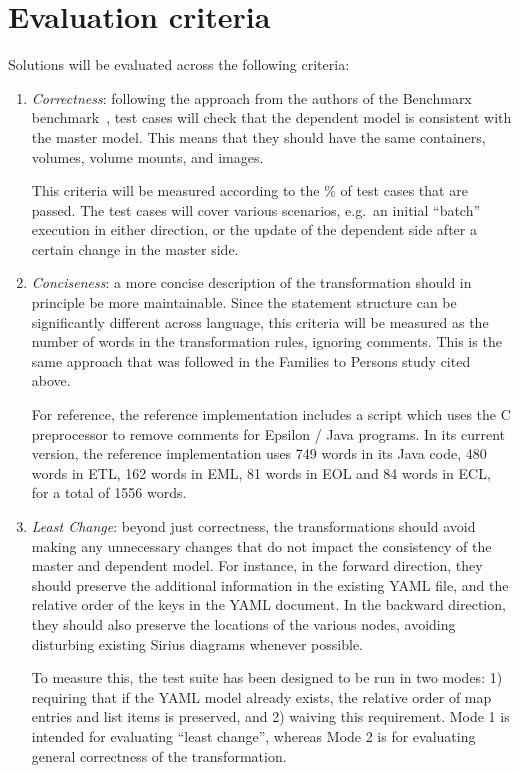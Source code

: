 \documentclass[sigconf,review]{acmart}
\begin{document}
\section{Evaluation criteria}

Solutions will be evaluated across the following criteria:

\begin{enumerate}
\item \emph{Correctness}: following the approach from the authors of the
  Benchmarx benchmark~\cite{anjorin_benchmarking_2020}, test cases will check
  that the dependent model is consistent with the master model. This means that
  they should have the same containers, volumes, volume mounts, and images.

  This criteria will be measured according to the \% of test cases that are
  passed. The test cases will cover various scenarios, e.g.\ an initial
  ``batch'' execution in either direction, or the update of the dependent side
  after a certain change in the master side.

\item \emph{Conciseness}: a more concise description of the transformation
  should in principle be more maintainable. Since the statement structure can be
  significantly different across language, this criteria will be measured as the
  number of words in the transformation rules, ignoring comments. This is the
  same approach that was followed in the Families to Persons study cited above.

  For reference, the reference implementation includes a 
  script which uses the C preprocessor to remove comments for Epsilon / Java
  programs. In its current version, the reference implementation uses 749 words
  in its Java code, 480 words in ETL, 162 words in EML, 81 words in EOL and 84
  words in ECL, for a total of 1556 words.

\item \emph{Least Change}: beyond just correctness, the transformations should
  avoid making any unnecessary changes that do not impact the consistency of the
  master and dependent model. For instance, in the forward direction, they
  should preserve the additional information in the existing YAML file, and the
  relative order of the keys in the YAML document. In the backward direction,
  they should also preserve the locations of the various nodes, avoiding
  disturbing existing Sirius diagrams whenever possible.

  To measure this, the test suite has been designed to be run in two modes: 1)
  requiring that if the YAML model already exists, the relative order of map
  entries and list items is preserved, and 2) waiving this requirement. Mode 1
  is intended for evaluating ``least change'', whereas Mode 2 is for evaluating
  general correctness of the transformation.


\end{enumerate}
\end{document}
